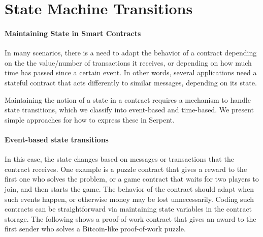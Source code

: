 \documentclass[12pt]{article}
\begin{document}
\section{State Machine Transitions}

\paragraph{Maintaining State in Smart Contracts}

In many scenarios, there is a need to adapt the behavior of a contract depending on the the value/number of transactions it receives, or depending on how much time has passed since a certain event. In other words, several applications need a stateful contract that acts differently to similar messages, depending on its state.

Maintaining the notion of a state in a contract requires a mechanism to handle state transitions, which we classify into event-based and time-based. We present simple approaches for how to express these in Serpent.

\paragraph{Event-based state transitions}

In this case, the state changes based on messages or transactions that the contract receives. One example is a puzzle contract that gives a reward to the first one who solves the problem, or a game contract that waits for two players to join, and then starts the game. The behavior of the contract should adapt when such events happen, or otherwise money may be lost unnecessarily. Coding such contracts can be straightforward via maintaining state variables in the contract storage. The following shows a proof-of-work contract that gives an award to the first sender who solves a Bitcoin-like proof-of-work puzzle.

\end{document}
